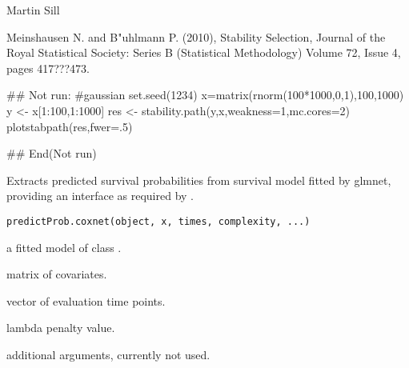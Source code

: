 \documentclass[letterpaper]{book}
\begin{document}
%
\begin{Author}\relax
Martin Sill \bsl{}
\end{Author}
%
\begin{References}\relax
Meinshausen N. and B\bsl{}"uhlmann P. (2010), Stability Selection, Journal of the Royal Statistical Society: Series B (Statistical Methodology) Volume 72, Issue 4, pages 417???473.
\end{References}
%
\begin{SeeAlso}\relax
\end{SeeAlso}
%
\begin{Examples}
\begin{ExampleCode}
## Not run: 
#gaussian
set.seed(1234)
x=matrix(rnorm(100*1000,0,1),100,1000)
y <- x[1:100,1:1000]%
res <- stability.path(y,x,weakness=1,mc.cores=2)
plotstabpath(res,fwer=.5)

## End(Not run)
\end{ExampleCode}
\end{Examples}
%
\begin{Description}\relax
Extracts predicted survival probabilities from survival model fitted by glmnet, providing an interface as required by . 
\end{Description}
%
\begin{Usage}
\begin{verbatim}
predictProb.coxnet(object, x, times, complexity, ...)
\end{verbatim}
\end{Usage}
%
\begin{Arguments}
\begin{ldescription}
\item[\code{object}] a fitted model of class .
\item[\code{x}]  matrix of covariates.
\item[\code{times}] vector of evaluation time points.
\item[\code{complexity}] lambda penalty value.
\item[\code{...}] additional arguments, currently not used.
\end{ldescription}
\end{Arguments}
\end{document}
